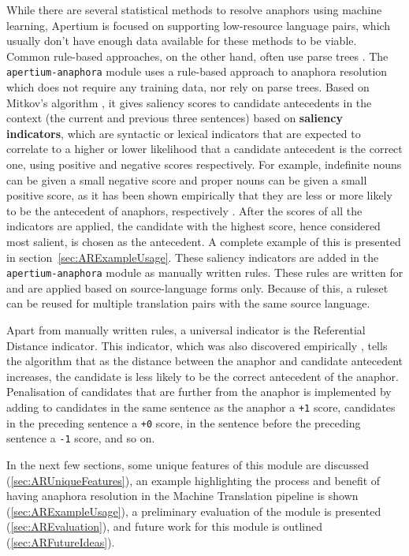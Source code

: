 \documentclass[free]{flammie}
\begin{document}
While there are several statistical methods to resolve anaphors using machine
learning, Apertium is focused on supporting low-resource language pairs, which
usually don't have enough data available for these methods to be viable.  Common
rule-based approaches, on the other hand, often use parse trees
\cite{lappin1994algorithm,baldwin1997cogniac,trouilleux2002rule,lee2013deterministic,loaiciga2015rule,zeldes2016when}.
The \texttt{apertium-anaphora} module uses a rule-based approach to anaphora
resolution which does not require any training data, nor rely on parse trees.
Based on Mitkov's algorithm \cite{mitkov1999multilingual}, it gives saliency
scores to candidate antecedents in the context (the current and previous three
sentences) based on \textbf{saliency indicators}, which are syntactic or lexical
indicators that are expected to correlate to a higher or lower likelihood that a
candidate antecedent is the correct one, using positive and negative scores
respectively.  For example, indefinite nouns can be given a small negative score
and proper nouns can be given a small positive score, as it has been shown
empirically that they are less or more likely to be the antecedent of anaphors,
respectively \cite{mitkov1999multilingual}.  After the scores of all the
indicators are applied, the candidate with the highest score, hence considered
most salient, is chosen as the antecedent.  A complete example of this is
presented in section~\ref{sec:ARExampleUsage}.  These saliency indicators are
added in the \texttt{apertium-anaphora} module as manually written rules.  These
rules are written for and are applied based on source-language forms only.
Because of this, a ruleset can be reused for multiple translation pairs with the
same source language.

Apart from manually written rules, a universal indicator is the Referential
Distance indicator.  This indicator, which was also discovered empirically
\cite{mitkov1999multilingual}, tells the algorithm that as the distance
between the anaphor and candidate antecedent increases, the candidate is less
likely to be the correct antecedent of the anaphor.  Penalisation of candidates
that are further from the anaphor is implemented by adding to candidates in the
same sentence as the anaphor a \texttt{+1} score, candidates in the preceding
sentence a \texttt{+0} score, in the sentence before the preceding sentence a
\texttt{-1} score, and so on.

In the next few sections, some unique features of this module are discussed
(\ref{sec:ARUniqueFeatures}), an example highlighting the process and benefit of
having anaphora resolution in the Machine Translation pipeline is shown
(\ref{sec:ARExampleUsage}), a preliminary evaluation of the module is presented
(\ref{sec:AREvaluation}), and future work for this module is outlined
(\ref{sec:ARFutureIdeas}).
\end{document}
